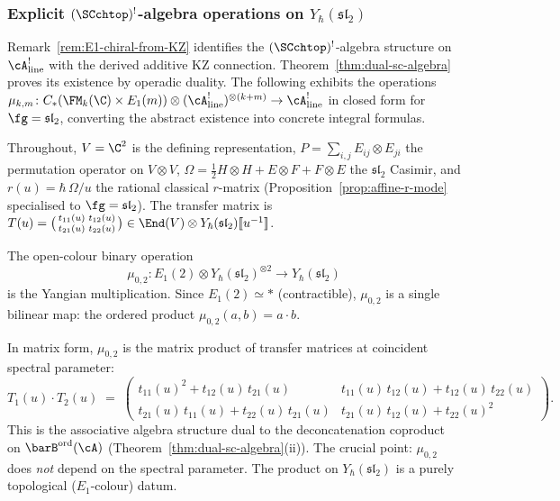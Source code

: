 
\subsubsection*{Explicit $(\SCchtop)^{!}$-algebra operations on
$Y_\hbar(\mathfrak{sl}_2)$}

Remark~\ref{rem:E1-chiral-from-KZ} identifies the
$(\SCchtop)^{!}$-algebra structure on $\cA^!_{\mathrm{line}}$ with the
derived additive KZ connection.
Theorem~\ref{thm:dual-sc-algebra} proves its existence by
operadic duality. The following exhibits the operations
$\mu_{k,m} \colon C_*(\FM_k(\C) \times E_1(m)) \otimes
(\cA^!_{\mathrm{line}})^{\otimes(k+m)} \to
\cA^!_{\mathrm{line}}$
in closed form for $\fg = \mathfrak{sl}_2$, converting the
abstract existence into concrete integral formulas.

Throughout, $V = \C^2$ is the defining representation,
$P = \sum_{i,j} E_{ij} \otimes E_{ji}$ the permutation operator
on $V \otimes V$,
$\Omega = \tfrac{1}{2}H \otimes H + E \otimes F + F \otimes E$
the $\mathfrak{sl}_2$ Casimir, and
$r(u) = \hbar\,\Omega/u$ the rational classical $r$-matrix
(Proposition~\ref{prop:affine-r-mode} specialised to
$\fg = \mathfrak{sl}_2$). The transfer matrix is
$T(u) = \bigl(\begin{smallmatrix}
t_{11}(u) & t_{12}(u) \\ t_{21}(u) & t_{22}(u)
\end{smallmatrix}\bigr)
\in \End(V) \otimes Y_\hbar(\mathfrak{sl}_2)[\![u^{-1}]\!]$.

\begin{computation}
\label{comp:mu02-yangian}
The open-colour binary operation
\[
\mu_{0,2} \colon E_1(2) \otimes
Y_\hbar(\mathfrak{sl}_2)^{\otimes 2} \to
Y_\hbar(\mathfrak{sl}_2)
\]
is the Yangian multiplication. Since $E_1(2) \simeq *$
(contractible), $\mu_{0,2}$ is a single bilinear map: the
ordered product
$\mu_{0,2}(a, b) = a \cdot b$.

In matrix form, $\mu_{0,2}$ is the matrix product of
transfer matrices at coincident spectral parameter:
\[
T_1(u) \cdot T_2(u)
\;=\;
\begin{pmatrix}
t_{11}(u)^2 + t_{12}(u)\,t_{21}(u)
 & t_{11}(u)\,t_{12}(u) + t_{12}(u)\,t_{22}(u) \\[3pt]
t_{21}(u)\,t_{11}(u) + t_{22}(u)\,t_{21}(u)
 & t_{21}(u)\,t_{12}(u) + t_{22}(u)^2
\end{pmatrix}.
\]
This is the associative algebra structure dual to
the deconcatenation coproduct on
$\barB^{\mathrm{ord}}(\cA)$
(Theorem~\ref{thm:dual-sc-algebra}(ii)).
The crucial point: $\mu_{0,2}$ does \emph{not} depend on the
spectral parameter. The product on
$Y_\hbar(\mathfrak{sl}_2)$ is a purely topological
($E_1$-colour) datum.
\end{computation}

